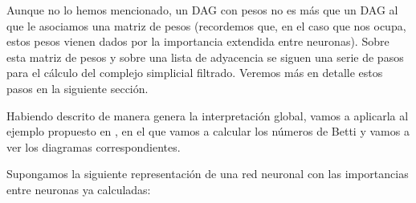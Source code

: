 \documentclass[12pt, a4paper, twoside]{book}
\numberwithin{equation}{section}
\theoremstyle{definition}
\newenvironment{ejem}
  {\pushQED{\qed}\renewcommand{\qedsymbol}{$\blacktriangleleft$}\ejemplo}
  {\popQED\endejemplo}
\theoremstyle{remark}
\theoremstyle{plain}
\begin{document}
	Aunque no lo hemos mencionado, un DAG con pesos no es más que un DAG
	al que le asociamos una matriz de pesos (recordemos que, en el caso 
	que nos ocupa, estos pesos vienen dados por la importancia extendida 
	entre neuronas). Sobre esta matriz de pesos y sobre una lista de 
	adyacencia se siguen una serie de pasos para el cálculo del complejo 
	simplicial filtrado. Veremos más en detalle estos pasos en la 
	siguiente sección. 

	Habiendo descrito de manera genera la interpretación global, vamos a 
	aplicarla al ejemplo propuesto en \cite{Articulo-Watanabe}, en el que 
	vamos a calcular los números de Betti y vamos a ver los diagramas 
	correspondientes.

	\begin{ejem}
		Supongamos la siguiente representación de una red neuronal con 
		las importancias entre neuronas ya calculadas:	
		\begin{figure}[H]
				\centering
\end{figure}
\end{ejem}
\end{document}
